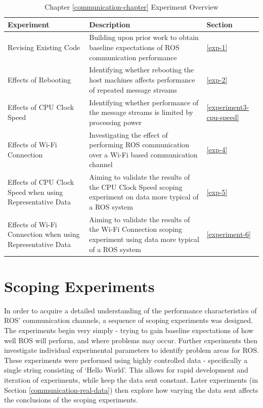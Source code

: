\documentclass{l4proj}
\begin{document}
\begin{table}[H]
\centering
\caption{Chapter \ref{communication-chapter} Experiment Overview}
\label{communication-experiment-overview}
\begin{tabular}{|p{}|p{}|p{}|}
\hline
\textbf{Experiment}         & \textbf{Description}                                                                              & \textbf{Section}              \\ \hline
Revising Existing Code      & Building upon prior work to obtain baseline expectations of ROS communication performance         & \ref{exp-1}                 \\ \hline
Effects of Rebooting        & Identifying whether rebooting the host machines affects performance of repeated message streams   & \ref{exp-2}                 \\ \hline
Effects of CPU Clock Speed  & Identifying whether performance of the message streams is limited by processing power             & \ref{experiment3-cpu-speed} \\ \hline
Effects of Wi-Fi Connection & Investigating the effect of performing ROS communication over a Wi-Fi based communication channel & \ref{exp-4}                 \\ \hline
Effects of CPU Clock Speed when using Representative Data & Aiming to validate the results of the CPU Clock Speed scoping experiment on data more typical of a ROS system  & \ref{exp-5} \\ \hline
Effects of Wi-Fi Connection when using Representative Data & Aiming to validate the results of the Wi-Fi Connection scoping experiment using data more typical of a ROS system & \ref{experiment-6} \\ \hline

\end{tabular}
\end{table}

\section{Scoping Experiments}
\label{communication-scoping-experiments}

In order to acquire a detailed understanding of the performance characteristics of ROS' communication channels, a sequence of scoping experiments was designed. The experiments begin very simply - trying to gain baseline expectations of how well ROS will perform, and where problems may occur. Further experiments then investigate individual experimental parameters to identify problem areas for ROS. These experiments were performed using highly controlled data - specifically a single string consisting of `Hello World'. This allows for rapid development and iteration of experiments, while keep the data sent constant. Later experiments (in Section \ref{communication-real-data}) then explore how varying the data sent affects the conclusions of the scoping experiments.
\end{document}

